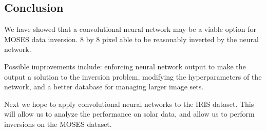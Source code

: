 \documentclass[twoside]{article}
\begin{document}
\begin{multicols}{2}
\section{Conclusion}

We have showed that a convolutional neural network may be a viable option for MOSES data inversion. 8 by 8 pixel able to be reasonably inverted by the neural network. \par Possible improvements include: enforcing neural network output to make the output a solution to the inversion problem, modifying the hyperparameters of the network, and a better database for managing larger image sets. \par Next we hope to apply convolutional neural networks to the IRIS dataset. This will allow us to analyze the performance on solar data, and allow us to perform inversions on the MOSES dataset.





\end{multicols}

	
	
\end{document}
